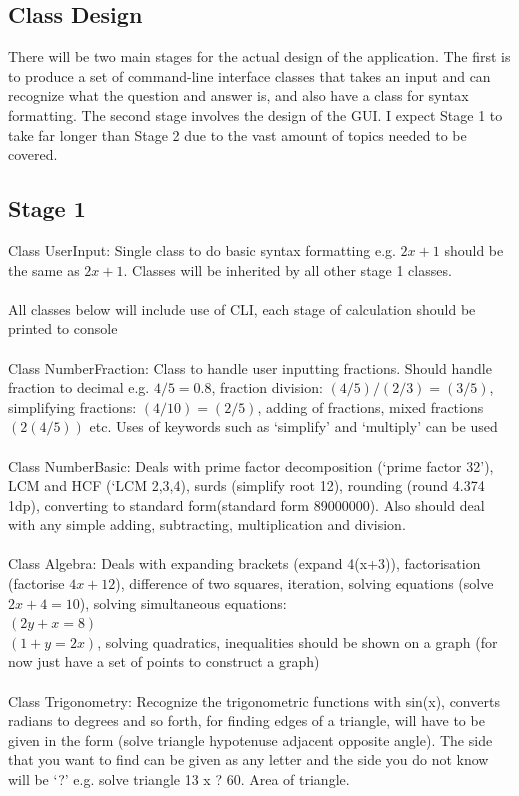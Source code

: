 \documentclass[final]{cmpreport}
\begin{document}
	\subsection{Class Design} \label{sec:design}
	There will be two main stages for the actual design of the application. The first is to produce a set of command-line interface classes that takes an input and can recognize what the question and answer is, and also have a class for syntax formatting. The second stage involves the design of the GUI. I expect Stage 1 to take far longer than Stage 2 due to the vast amount of topics needed to be covered.
	\subsection*{Stage 1}
	Class UserInput: Single class to do basic syntax formatting e.g. $2x+1$ should be the same as $2x + 1$. Classes will be inherited by all other stage 1 classes.\\
	\\All classes below will include use of CLI, each stage of calculation should be printed to console\\
	\\Class NumberFraction: Class to handle user inputting fractions. Should handle fraction to decimal e.g. $4/5 = 0.8$, fraction division: $(4/5)/(2/3) = (3/5)$, simplifying fractions: $(4/10) = (2/5)$, adding of fractions, mixed fractions $(2(4/5))$ etc. Uses of keywords such as ‘simplify’ and ‘multiply’ can be used\\
	\\Class NumberBasic: Deals with prime factor decomposition (‘prime factor 32’), LCM and HCF (‘LCM 2,3,4), surds (simplify root 12), rounding (round 4.374 1dp), converting to standard form(standard form 89000000). Also should deal with any simple adding, subtracting, multiplication and division.\\
	\\Class Algebra: Deals with expanding brackets (expand 4(x+3)), factorisation (factorise $4x+12$), difference of two squares, iteration, solving equations (solve $2x+4=10$), solving simultaneous equations:  \\$(2y + x = 8)$\\$( 1+y=2x)$, solving quadratics, inequalities should be shown on a graph (for now just have a set of points to construct a graph)\\
	\\Class Trigonometry: Recognize the trigonometric functions with sin(x), converts radians to degrees and so forth, for finding edges of a triangle, will have to be given in the form (solve triangle hypotenuse adjacent opposite angle). The side that you want to find can be given as any letter and the side you do not know will be ‘?’ e.g. solve triangle 13 x ? 60. Area of triangle.\\
\end{document}
